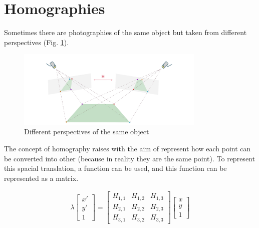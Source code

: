 \section{Homographies}

Sometimes there are photographies of the same object but taken from different perspectives (Fig. \ref{fig:homog}). 

\begin{figure}[H]
    \centering
    \includegraphics[width=0.8\textwidth]{img/homog}
    \caption{Different perspectives of the same object \cite{noauthor_opencv_nodate}}
    \label{fig:homog}
\end{figure}

The concept of homography raises with the aim of represent how each point can be converted into other (because in reality they are the same point). To represent this spacial translation, a function can be used, and this function can be represented as a matrix.

\begin{gather*}
    \lambda
    \begin{bmatrix}
        x' \\ y' \\ 1
    \end{bmatrix} = 
    \begin{bmatrix}
        H_{1,1} & H_{1,2} & H_{1,3} \\
        H_{2,1} & H_{2,2} & H_{2,3} \\
        H_{3,1} & H_{3,2} & H_{3,3}
    \end{bmatrix}
    \begin{bmatrix}
        x \\ y \\ 1
    \end{bmatrix}
\end{gather*}


